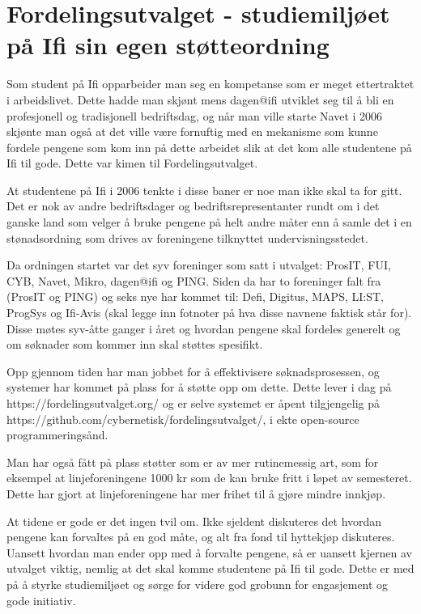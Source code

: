 \chapter[Fordelingsutvalget]{Fordelingsutvalget - studiemiljøet på Ifi sin egen støtteordning}

\author{Skrevet av Arne Hassel og Nikolas Papaioannou}

Som student på Ifi opparbeider man seg en kompetanse som er meget ettertraktet i arbeidslivet. Dette hadde man skjønt mens dagen@ifi utviklet seg til å bli en profesjonell og tradisjonell bedriftsdag, og når man ville starte Navet i 2006 skjønte man også at det ville være fornuftig med en mekanisme som kunne fordele pengene som kom inn på dette arbeidet slik at det kom alle studentene på Ifi til gode. Dette var kimen til Fordelingsutvalget.

At studentene på Ifi i 2006 tenkte i disse baner er noe man ikke skal ta for gitt. Det er nok av andre bedriftsdager og bedriftsrepresentanter rundt om i det ganske land som velger å bruke pengene på helt andre måter enn å samle det i en stønadsordning som drives av foreningene tilknyttet undervisningsstedet.

Da ordningen startet var det syv foreninger som satt i utvalget: ProsIT, FUI, CYB, Navet, Mikro, dagen@ifi og PING. Siden da har to foreninger falt fra (ProsIT og PING) og seks nye har kommet til: Defi, Digitus, MAPS, LI:ST, ProgSys og Ifi-Avis (skal legge inn fotnoter på hva disse navnene faktisk står for). Disse møtes syv-åtte ganger i året og hvordan pengene skal fordeles generelt og om søknader som kommer inn skal støttes spesifikt.

Opp gjennom tiden har man jobbet for å effektivisere søknadsprosessen, og systemer har kommet på plass for å støtte opp om dette. Dette lever i dag på https://fordelingsutvalget.org/ og er selve systemet er åpent tilgjengelig på https://github.com/cybernetisk/fordelingsutvalget/, i ekte open-source programmeringsånd.

Man har også fått på plass støtter som er av mer rutinemessig art, som for eksempel at linjeforeningene 1000 kr som de kan bruke fritt i løpet av semesteret. Dette har gjort at linjeforeningene har mer frihet til å gjøre mindre innkjøp.

At tidene er gode er det ingen tvil om. Ikke sjeldent diskuteres det hvordan pengene kan forvaltes på en god måte, og alt fra fond til hyttekjøp diskuteres. Uansett hvordan man ender opp med å forvalte pengene, så er uansett kjernen av utvalget viktig, nemlig at det skal komme studentene på Ifi til gode. Dette er med på å styrke studiemiljøet og sørge for videre god grobunn for engasjement og gode initiativ.
